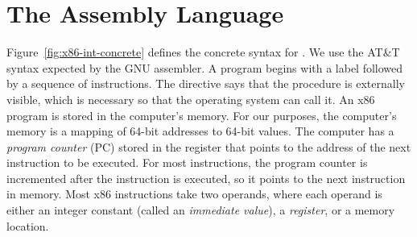 \documentclass[7x10]{TimesAPriori_MIT}%
\begin{document}
\section{The \LangXInt{} Assembly Language}
\label{sec:x86}

Figure~\ref{fig:x86-int-concrete} defines the concrete syntax for
\LangXInt{}.  We use the AT\&T syntax expected by the GNU
assembler.
%
A program begins with a  label followed by a sequence of
instructions. The  directive says that the 
procedure is externally visible, which is necessary so that the
operating system can call it.
%
An x86 program is stored in the computer's memory.  For our purposes,
the computer's memory is a mapping of 64-bit addresses to 64-bit
values.  The computer has a \emph{program counter} (PC) stored in the  register that points to
the address of the next instruction to be executed.  For most
instructions, the program counter is incremented after the instruction
is executed, so it points to the next instruction in memory.  Most x86
instructions take two operands, where each operand is either an
integer constant (called an \emph{immediate value}), a \emph{register}, or a memory location.

\newcommand{\allregisters}{\key{rsp} \MID \key{rbp} \MID \key{rax} \MID \key{rbx} \MID \key{rcx}
              \MID \key{rdx} \MID \key{rsi} \MID \key{rdi} \MID \\
              && \key{r8} \MID \key{r9} \MID \key{r10}
              \MID \key{r11} \MID \key{r12} \MID \key{r13}
              \MID \key{r14} \MID \key{r15}}
\end{document}
